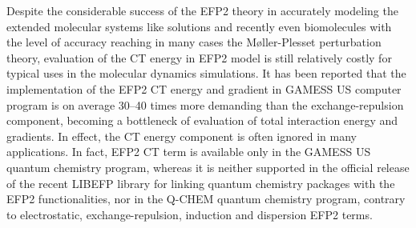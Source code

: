 \documentclass[aip,jcp,amsmath,amssymb,reprint,floatfix]{revtex4-1}
\begin{document}
Despite the considerable success of the EFP2 theory
in accurately modeling the extended molecular systems 
like solutions\cite{Sattasathuchana.Xu.Gordon.JPCA.2019,
   Blasiak.Londergan.Webb.Cho.ACR.2017,
   Kuroki.Mori.ChemLett.2016,
   Ghosh.Cho.Choi.JPCB.2014}
and recently even biomolecules\cite{Blasiak.Ritchie.Webb.Cho.PCCP.2016,
Xu.Blasiak.Cho.Layfield.Londergan.JPCL.2018,
Gurunathan.Acharya.Ghosh.Kosenkov.Kaliman.Shao.Krylov.Slipchenko.JPCB.2016,
Ghosh.Kosenkov.Vanovschi.Williams.Herbert.Gordon.Schmidt.Slipchenko.Krylov.JPCA.2010}
with the level of accuracy
reaching in many cases\cite{Gordon.Smith.Xu.Slipchenko.AnnuRevPhysChem.2013} 
the M{\o}ller\hyp{}Plesset perturbation theory\cite{Moller.Plesset.PhysRev.1934},
evaluation of the CT energy in EFP2 model is still relatively costly for
typical uses in the
molecular dynamics simulations. It has been reported that 
the implementation of the EFP2 CT energy and gradient in GAMESS US computer program\cite{GAMESS.JCC.1993}
is on average 30--40 times more demanding than the exchange\hyp{}repulsion
component, becoming a bottleneck of evaluation of total interaction 
energy and gradients.\cite{Gordon.Smith.Xu.Slipchenko.AnnuRevPhysChem.2013,
Li.Gordon.Jensen.JCP.2006}
In effect, the CT energy component is often ignored 
in many applications.\cite{Kuroki.Mori.JPCB.2019,
Blasiak.Londergan.Webb.Cho.ACR.2017,
Tommaso.Lafiosca.Cappelli.JCTC.2017,
Gurunathan.Acharya.Ghosh.Kosenkov.Kaliman.Shao.Krylov.Slipchenko.JPCB.2016,
Budzak.Laurent.Laurence.Medved.Jacquemin.JCTC.2016,
Smith.Gordon.Slipchenko.JPCA.2011,
Smith.Gordon.Slipchenko.JPCA.2011.2,
Ghosh.Kosenkov.Vanovschi.Williams.Herbert.Gordon.Schmidt.Slipchenko.Krylov.JPCA.2010,
Smith.Gordon.Slipchenko.JPCA.2008}
In fact,
EFP2 CT term is available only in the GAMESS US quantum chemistry program,\cite{GAMESS.JCC.1993}
whereas it is neither supported in the official release 
of the recent LIBEFP library for linking quantum chemistry packages 
with the EFP2 functionalities,\cite{Kaliman.Slipchenko.JCC.2015}
nor in the Q\hyp{}CHEM quantum chemistry 
program,\cite{Ghosh.Kosenkov.Vanovschi.Flick.Kaliman.Shao.Gilbert.Krylov.Slipchenko.JCC.2013}
contrary to electrostatic, exchange\hyp{}repulsion, induction and dispersion EFP2 terms.


\end{document}
